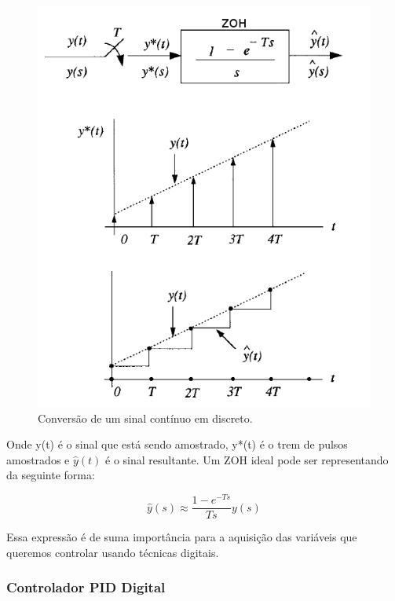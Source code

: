 \begin{figure}[H]
  \caption{Conversão de um sinal contínuo em discreto.}
  \begin{center}
      \includegraphics[scale=0.65]{referencial/img/zoh_wie_p155}
  \end{center}
  \label{fig:zoh_wie_p155}
\end{figure}

Onde y(t) é o sinal que está sendo amostrado, y*(t) é o trem de pulsos amostrados e $\hat{y}(t)$ é o sinal resultante. Um ZOH ideal pode ser representando da seguinte forma:

\begin{equation}
  \hat{y}(s) \approx \frac{1-e^{-Ts}}{Ts}y(s)
\end{equation}

Essa expressão é de suma importância para a aquisição das variáveis que queremos controlar usando técnicas digitais.



\subsubsection{Controlador PID Digital}

